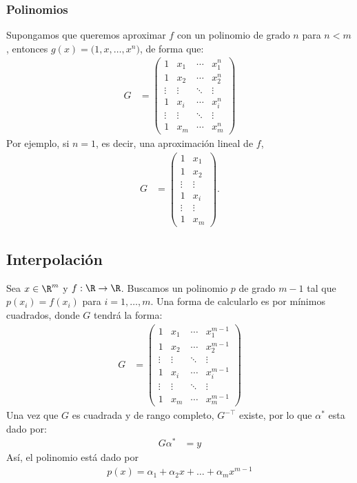 \subsubsection{Polinomios}
Supongamos que queremos aproximar $f$ con un polinomio de grado $n$ para $n<m$, entonces $g(x)=\bigl(1,x,\ldots,x^n \bigr)$, de forma que:
\begin{align*}
G&=\begin{pmatrix}
1 & x_1 & \cdots & x_1^n\\
1 & x_2 & \cdots & x_2^n\\
\vdots & \vdots & \ddots & \vdots\\
1 & x_i & \cdots & x_i^n\\
\vdots & \vdots & \ddots & \vdots\\
1 & x_m & \cdots & x_m^n
\end{pmatrix}
\end{align*}
Por ejemplo, si $n=1$, es decir, una aproximación lineal de $f$,
\begin{align*}
G&=\begin{pmatrix}
1 & x_1\\
1 & x_2\\
\vdots & \vdots\\
1 & x_i \\
\vdots & \vdots\\
1 & x_m
\end{pmatrix}.
\end{align*}
\subsection{Interpolación}
Sea $x\in \R^m$ y $f:\R\to\R$. Buscamos un polinomio $p$ de grado $m-1$ tal que $p(x_i)=f(x_i)$ para $i=1,\ldots,m$. Una forma de calcularlo es por mínimos cuadrados, donde $G$ tendrá la forma:
\begin{align*}
G&=\begin{pmatrix}
1 & x_1 & \cdots & x_1^{m-1}\\
1 & x_2 & \cdots & x_2^{m-1}\\
\vdots & \vdots & \ddots & \vdots\\
1 & x_i & \cdots & x_i^{m-1}\\
\vdots & \vdots & \ddots & \vdots\\
1 & x_m & \cdots & x_m^{m-1}
\end{pmatrix}
\end{align*}
Una vez que $G$ es cuadrada y de rango completo, $G^{-\top}$ existe, por lo que $\alpha^*$ esta dado por:
\begin{align*}
G\alpha^*&=y
\end{align*}
Así, el polinomio está dado por
\begin{align*}
p(x)=\alpha_1 + \alpha_2 x + \ldots + \alpha_{m}x^{m-1}
\end{align*}
